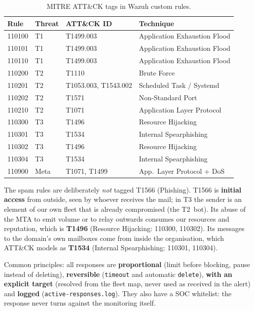 \documentclass[11pt,a4paper]{article}
\begin{document}
\begin{table}[H]
  \centering
  \caption{MITRE ATT\&CK tags in Wazuh custom rules.}
  \label{tab:mitre-rules}
  \small
  \begin{tabular}{@{}llll@{}}
    \toprule
    \textbf{Rule} & \textbf{Threat} & \textbf{ATT\&CK ID} & \textbf{Technique} \\
    \midrule
    110100 & T1 & T1499.003 & Application Exhaustion Flood \\
    110101 & T1 & T1499.003 & Application Exhaustion Flood \\
    110110 & T1 & T1499.003 & Application Exhaustion Flood \\
    110200 & T2 & T1110    & Brute Force \\
    110201 & T2 & T1053.003, T1543.002 & Scheduled Task / Systemd \\
    110202 & T2 & T1571    & Non-Standard Port \\
    110210 & T2 & T1071    & Application Layer Protocol \\
    110300 & T3 & T1496    & Resource Hijacking \\
    110301 & T3 & T1534    & Internal Spearphishing \\
    110302 & T3 & T1496    & Resource Hijacking \\
    110304 & T3 & T1534    & Internal Spearphishing \\
    110900 & Meta & T1071, T1499 & App.\ Layer Protocol + DoS \\
    \bottomrule
  \end{tabular}
\end{table}

The spam rules are deliberately \emph{not} tagged T1566 (Phishing). T1566 is
\textbf{initial access} from outside, seen by whoever receives the mail; in T3 the sender is
an element of our own fleet that is already compromised (the T2~bot). Its abuse of the MTA
to emit volume or to relay outwards consumes our resources and reputation, which is
\textbf{T1496} (Resource Hijacking: 110300, 110302). Its messages to the domain's own
mailboxes come from inside the organisation, which ATT\&CK models as \textbf{T1534}
(Internal Spearphishing: 110301, 110304).

Common principles: all responses are \textbf{proportional} (limit before blocking, pause
instead of deleting), \textbf{reversible} (\texttt{timeout} and automatic \texttt{delete}),
\textbf{with an explicit target} (resolved from the fleet map, never used as received in the
alert) and \textbf{logged} (\texttt{active-responses.log}). They also have a SOC whitelist:
the response never turns against the monitoring itself.
\end{document}
